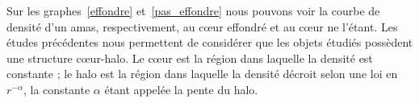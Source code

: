 	Sur les graphes~\ref{effondre} et~\ref{pas_effondre} nous pouvons voir la courbe de densité
	d'un amas, respectivement, au cœur effondré et au cœur ne l'étant.
	Les études précédentes nous permettent de considérer que les objets étudiés possèdent une structure cœur-halo. Le cœur est la région dans laquelle la densité est constante ; le halo est la région dans laquelle la densité
	décroit selon une loi en $r^{-\alpha}$, la constante $\alpha$ étant appelée la pente du halo.

